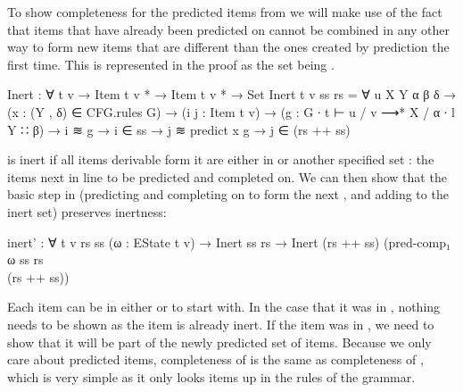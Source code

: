 		To show completeness for the predicted items from 
		we will make use of the fact that items that have already been
		predicted on cannot be combined in any other way to form new items that
		are different than the ones created by prediction the first time. This
		is represented in the proof as the set  being
		.

		\begin{code}
			  Inert : ∀ {t v} → Item t v * → Item t v * → Set
			  Inert {t} {v} ss rs =
			    ∀ {u X Y α β δ} →
			    (x : (Y , δ) ∈ CFG.rules G) →
			    (i j : Item t v) →
			    (g : G ∙ t ⊢ u / v ⟶* X / α ∙ l Y ∷ β) →
			    i ≋ g → i ∈ ss →
			    j ≋ predict x g →
			      j ∈ (rs ++ ss)
		\end{code}

		 is inert if all items derivable form it are either in
		 or another specified set : the items next in
		line to be predicted and completed on. We can then show that the basic
		step in  (predicting and completing on 
		to form the next , and adding  to the inert set)
		preserves inertness:

		\begin{code}
			  inert' : ∀ {t v rs ss} (ω : EState t v) →
			    Inert ss rs →
			    Inert (rs ++ ss) (pred-comp₁ ω ss rs \\ (rs ++ ss))
    	\end{code}

		Each item can be in either  or  to start with. In
		the case that it was in , nothing needs to be shown as the
		item is already inert. If the item was in , we need to show
		that it will be part of the newly predicted set of items. Because we
		only care about predicted items, completeness of  is
		the same as completeness of , which is very simple as it
		only looks items up in the rules of the grammar.

